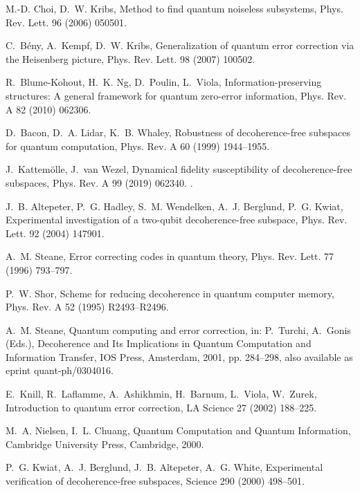 \documentclass[3p,sort&compress,12pt]{elsarticle}
\begin{document}
\begin{thebibliography}{100}
M.-D. Choi, D.~W. Kribs, Method to find quantum noiseless subsystems, Phys.
  Rev. Lett. 96 (2006) 050501.

C.~B{\'e}ny, A.~Kempf, D.~W. Kribs, Generalization of quantum error correction
  via the {H}eisenberg picture, Phys. Rev. Lett. 98 (2007) 100502.

R.~Blume-Kohout, H.~K. Ng, D.~Poulin, L.~Viola, Information-preserving
  structures: {A} general framework for quantum zero-error information, Phys.
  Rev. A 82 (2010) 062306.

D.~Bacon, D.~A. Lidar, K.~B. Whaley, Robustness of decoherence-free subspaces
  for quantum computation, Phys. Rev. A 60 (1999) 1944--1955.

J.~Kattem\"olle, J.~van Wezel, Dynamical fidelity susceptibility of
  decoherence-free subspaces, Phys. Rev. A 99 (2019) 062340.
\newblock \href {http://dx.doi.org/10.1103/PhysRevA.99.062340}
  {}.

J.~B. Altepeter, P.~G. Hadley, S.~M. Wendelken, A.~J. Berglund, P.~G. Kwiat,
  Experimental investigation of a two-qubit decoherence-free subspace, Phys.
  Rev. Lett. 92 (2004) 147901.

A.~M. Steane, Error correcting codes in quantum theory, Phys. Rev. Lett. 77
  (1996) 793--797.

P.~W. Shor, Scheme for reducing decoherence in quantum computer memory, Phys.
  Rev. A 52 (1995) R2493--R2496.

A.~M. Steane, Quantum computing and error correction, in: P.~Turchi, A.~Gonis
  (Eds.), Decoherence and Its Implications in Quantum Computation and
  Information Transfer, IOS Press, Amsterdam, 2001, pp. 284--298, also
  available as eprint quant-ph/0304016.

E.~Knill, R.~Laflamme, A.~Ashikhmin, H.~Barnum, L.~Viola, W.~Zurek,
  Introduction to quantum error correction, LA Science 27 (2002) 188--225.

M.~A. Nielsen, I.~L. Chuang, Quantum Computation and Quantum Information,
  Cambridge University Press, Cambridge, 2000.

P.~G. Kwiat, A.~J. Berglund, J.~B. Altepeter, A.~G. White, Experimental
  verification of decoherence-free subspaces, Science 290 (2000) 498--501.


\end{thebibliography}
\end{document}
